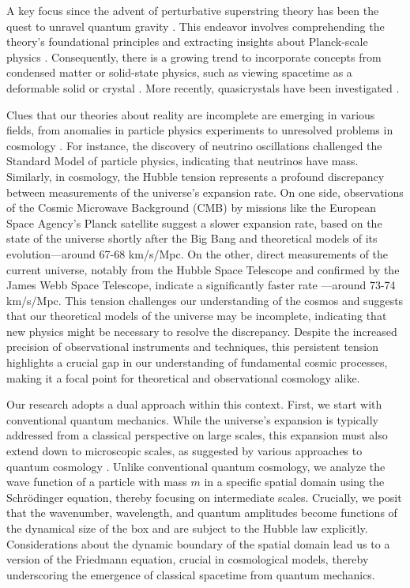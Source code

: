 \documentclass{article}
\begin{document}
A key focus since the advent of perturbative superstring theory has been the quest to unravel quantum gravity \cite{Kiefer}. This endeavor involves comprehending the theory's foundational principles and extracting insights about Planck-scale physics \cite{Rovelli1998}. Consequently, there is a growing trend to incorporate concepts from condensed matter or solid-state physics, such as viewing spacetime as a deformable solid or crystal \cite{Tahim2009}. More recently, quasicrystals have been investigated \cite{Amaral:2023mgf,modelsetemergence}.


Clues that our theories about reality are incomplete are emerging in various fields, from anomalies in particle physics experiments to unresolved problems in cosmology \cite{lawsofnature}. For instance, the discovery of neutrino oscillations challenged the Standard Model of particle physics, indicating that neutrinos have mass. Similarly, in cosmology, the Hubble tension \cite{hubbletension} represents a profound discrepancy between measurements of the universe's expansion rate. On one side, observations of the Cosmic Microwave Background (CMB) by missions like the European Space Agency's Planck satellite suggest a slower expansion rate, based on the state of the universe shortly after the Big Bang and theoretical models of its evolution—around 67-68 km/s/Mpc. On the other, direct measurements of the current universe, notably from the Hubble Space Telescope and confirmed by the James Webb Space Telescope, indicate a significantly faster rate \cite{hubble}—around 73-74 km/s/Mpc. This tension challenges our understanding of the cosmos and suggests that our theoretical models of the universe may be incomplete, indicating that new physics might be necessary to resolve the discrepancy. Despite the increased precision of observational instruments and techniques, this persistent tension highlights a crucial gap in our understanding of fundamental cosmic processes, making it a focal point for theoretical and observational cosmology alike.


Our research adopts a dual approach within this context. First, we start with conventional quantum mechanics. While the universe's expansion is typically addressed from a classical perspective on large scales, this expansion must also extend down to microscopic scales, as suggested by various approaches to quantum cosmology \cite{bojowald,Kuzmichev}. Unlike conventional quantum cosmology, we analyze the wave function of a particle with mass $m$ in a specific spatial domain using the Schr{\"o}dinger equation, thereby focusing on intermediate scales. Crucially, we posit that the wavenumber, wavelength, and quantum amplitudes become functions of the dynamical size of the box and are subject to the Hubble law explicitly. Considerations about the dynamic boundary of the spatial domain lead us to a version of the Friedmann equation, crucial in cosmological models, thereby underscoring the emergence of classical spacetime from quantum mechanics. 
\end{document}
